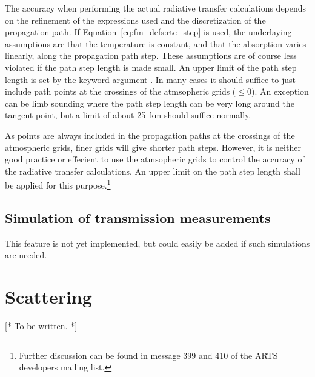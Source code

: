 The accuracy when performing the actual radiative transfer
calculations depends on the refinement of the expressions used and the
discretization of the propagation path. If
Equation~\ref{eq:fm_defs:rte_step} is used, the underlaying
assumptions are that the temperature is constant, and that the
absorption varies linearly, along the propagation path step. These
assumptions are of course less violated if the path step length is
made small. An upper limit of the path step length is set by the
keyword argument . In many cases it should suffice to
just include path points at the crossings of the atmsopheric grids
($\leq0$). An exception can be limb sounding where the
path step length can be very long around the tangent point, but a
limit of about 25~km should suffice normally. 

As points are always included in the propagation paths at the
crossings of the atmospheric grids, finer grids will give shorter path
steps. However, it is neither good practice or effecient to use the
atmsopheric grids to control the accuracy of the radiative transfer
calculations. An upper limit on the path step length shall be applied
for this purpose.\footnote{Further discussion can be found in message
  399 and 410 of the ARTS developers mailing list.}



\subsection{Simulation of transmission measurements}
\label{sec:fm_defs:trans_sim}

This feature is not yet implemented, but could easily be added if such
simulations are needed.



\section{Scattering}
\label{sec:fm_defs:scattering}

[* To be written. *]





